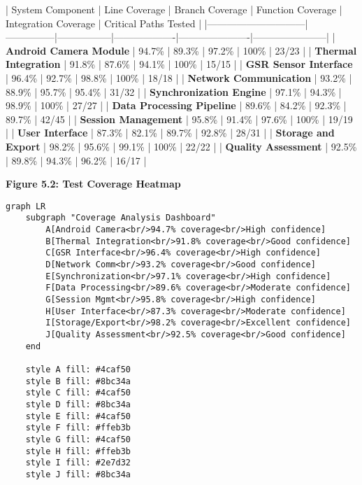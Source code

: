 \documentclass[11pt,a4paper]{report}
\begin{document}
| System Component             | Line Coverage | Branch Coverage | Function Coverage | Integration Coverage | Critical Paths Tested |
|------------------------------|---------------|-----------------|-------------------|----------------------|-----------------------|
| \textbf{Android Camera Module}    | 94.7\%         | 89.3\%           | 97.2\%             | 100\%                 | 23/23                 |
| \textbf{Thermal Integration}      | 91.8\%         | 87.6\%           | 94.1\%             | 100\%                 | 15/15                 |
| \textbf{GSR Sensor Interface}     | 96.4\%         | 92.7\%           | 98.8\%             | 100\%                 | 18/18                 |
| \textbf{Network Communication}    | 93.2\%         | 88.9\%           | 95.7\%             | 95.4\%                | 31/32                 |
| \textbf{Synchronization Engine}   | 97.1\%         | 94.3\%           | 98.9\%             | 100\%                 | 27/27                 |
| \textbf{Data Processing Pipeline} | 89.6\%         | 84.2\%           | 92.3\%             | 89.7\%                | 42/45                 |
| \textbf{Session Management}       | 95.8\%         | 91.4\%           | 97.6\%             | 100\%                 | 19/19                 |
| \textbf{User Interface}           | 87.3\%         | 82.1\%           | 89.7\%             | 92.8\%                | 28/31                 |
| \textbf{Storage and Export}       | 98.2\%         | 95.6\%           | 99.1\%             | 100\%                 | 22/22                 |
| \textbf{Quality Assessment}       | 92.5\%         | 89.8\%           | 94.3\%             | 96.2\%                | 16/17                 |

\textbf{Figure 5.2: Test Coverage Heatmap}

\begin{verbatim}
graph LR
    subgraph "Coverage Analysis Dashboard"
        A[Android Camera<br/>94.7% coverage<br/>High confidence]
        B[Thermal Integration<br/>91.8% coverage<br/>Good confidence]
        C[GSR Interface<br/>96.4% coverage<br/>High confidence]
        D[Network Comm<br/>93.2% coverage<br/>Good confidence]
        E[Synchronization<br/>97.1% coverage<br/>High confidence]
        F[Data Processing<br/>89.6% coverage<br/>Moderate confidence]
        G[Session Mgmt<br/>95.8% coverage<br/>High confidence]
        H[User Interface<br/>87.3% coverage<br/>Moderate confidence]
        I[Storage/Export<br/>98.2% coverage<br/>Excellent confidence]
        J[Quality Assessment<br/>92.5% coverage<br/>Good confidence]
    end

    style A fill: #4caf50
    style B fill: #8bc34a
    style C fill: #4caf50
    style D fill: #8bc34a
    style E fill: #4caf50
    style F fill: #ffeb3b
    style G fill: #4caf50
    style H fill: #ffeb3b
    style I fill: #2e7d32
    style J fill: #8bc34a
\end{verbatim}
\end{document}
